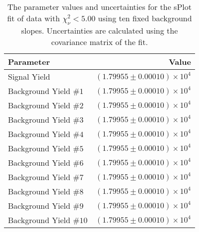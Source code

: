 
\begin{table}[ht]
    \begin{center}
        \begin{tabular}{lr}\toprule
            Parameter & Value \\\midrule
            Signal Yield & $(1.79955 \pm 0.00010) \times 10^{4}$ \\
            Background Yield $\#1$ & $(1.79955 \pm 0.00010) \times 10^{4}$ \\
            Background Yield $\#2$ & $(1.79955 \pm 0.00010) \times 10^{4}$ \\
            Background Yield $\#3$ & $(1.79955 \pm 0.00010) \times 10^{4}$ \\
            Background Yield $\#4$ & $(1.79955 \pm 0.00010) \times 10^{4}$ \\
            Background Yield $\#5$ & $(1.79955 \pm 0.00010) \times 10^{4}$ \\
            Background Yield $\#6$ & $(1.79955 \pm 0.00010) \times 10^{4}$ \\
            Background Yield $\#7$ & $(1.79955 \pm 0.00010) \times 10^{4}$ \\
            Background Yield $\#8$ & $(1.79955 \pm 0.00010) \times 10^{4}$ \\
            Background Yield $\#9$ & $(1.79955 \pm 0.00010) \times 10^{4}$ \\
            Background Yield $\#10$ & $(1.79955 \pm 0.00010) \times 10^{4}$ \\\bottomrule
        \end{tabular}
        \caption{The parameter values and uncertainties for the sPlot fit of data with $\chi^2_\nu < 5.00$ using ten fixed background slopes. Uncertainties are calculated using the covariance matrix of the fit.}\label{tab:splot-fit-results-chisqdof-5.00-fixed-10}
    \end{center}
\end{table}
